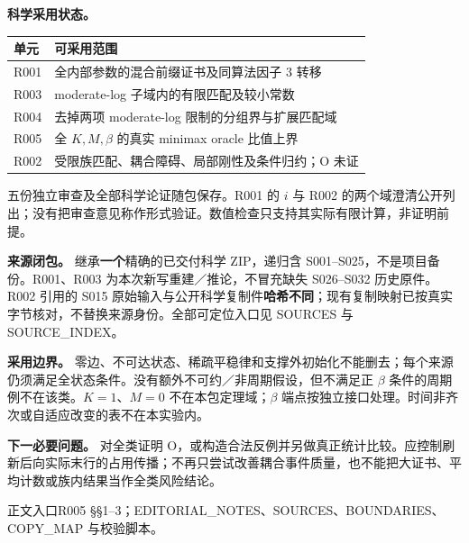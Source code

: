 \documentclass[11pt,a4paper]{article}
\newcommand{\entry}[1]{\vfill{\noindent\small\raggedright 正文入口\quad #1\par}}
\begin{document}
\textbf{科学采用状态。}
\begin{center}
\begin{tabularx}{\textwidth}{@{}lX@{}}\toprule
单元 & 可采用范围\\\midrule
R001 & 全内部参数的混合前缀证书及同算法因子 $3$ 转移\\
R003 & moderate-log 子域内的有限匹配及较小常数\\
R004 & 去掉两项 moderate-log 限制的分组界与扩展匹配域\\
R005 & 全 $K,M,\beta$ 的真实 minimax oracle 比值上界\\
R002 & 受限族匹配、耦合障碍、局部刚性及条件归约；O 未证\\\bottomrule
\end{tabularx}
\end{center}
五份独立审查及全部科学论证随包保存。R001 的 $i$ 与 R002 的两个域澄清公开列出；没有把审查意见称作形式验证。数值检查只支持其实际有限计算，非证明前提。

\textbf{来源闭包。} 继承\textbf{一个}精确的已交付科学 ZIP，递归含 S001--S025，不是项目备份。R001、R003 为本次新写重建／推论，不冒充缺失 S026--S032 历史原件。R002 引用的 S015 原始输入与公开科学复制件\textbf{哈希不同}；现有复制映射已按真实字节核对，不替换来源身份。全部可定位入口见 SOURCES 与 SOURCE\_INDEX。

\textbf{采用边界。} 零边、不可达状态、稀疏平稳律和支撑外初始化不能删去；每个来源仍须满足全状态条件。没有额外不可约／非周期假设，但不满足正 $\beta$ 条件的周期例不在该类。$K=1$、$M=0$ 不在本包定理域；$\beta$ 端点按独立接口处理。时间非齐次或自适应改变的表不在本实验内。

\textbf{下一必要问题。} 对全类证明 O，或构造合法反例并另做真正统计比较。应控制刷新后向实际末行的占用传播；不再只尝试改善耦合事件质量，也不能把大证书、平均计数或族内结果当作全类风险结论。
\entry{R005 §§1--3；EDITORIAL\_NOTES、SOURCES、BOUNDARIES、COPY\_MAP 与校验脚本。}
\end{document}
